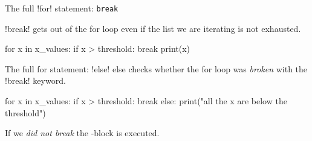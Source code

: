\documentclass[hyperref={pdfpagelabels=false},table, handout]{beamer}
\begin{document}
\begin{frame}[fragile]{The full \pyth!for! statement: \texttt{break}}

\pyth!break! gets out of the for loop even if the list we are iterating is not exhausted.
\begin{python}
for x in x_values:
  if x > threshold:
    break
  print(x)
\end{python}
\end{frame}
\begin{frame}[fragile]{The full for statement: \pyth!else!}
 \alert{else} checks whether the for loop was \emph{broken} with the \pyth!break! keyword.
\begin{python}
for x in x_values:
  if x > threshold:
    break
else:
  print("all the x are below the threshold")
\end{python}
If we \emph{did not break} the -block is executed.
\end{frame}
\end{document}
